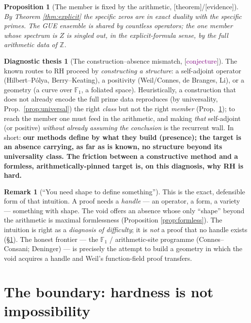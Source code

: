 \documentclass[11pt,a4paper]{article}
\newtheorem{proposition}[theorem]{Proposition}
\theoremstyle{definition}
\newtheorem{remark}[theorem]{Remark}
\newtheorem{principle}[theorem]{Diagnostic thesis}
\newcommand{\Z}{\mathbb{Z}}
\newcommand{\F}{\mathbb{F}}
\newcommand{\TAGthm}{{\small\textsf{[\textcolor{green!45!black}{theorem}]}}}
\newcommand{\TAGev}{{\small\textsf{[\textcolor{orange!80!black}{evidence}]}}}
\newcommand{\TAGconj}{{\small\textsf{[\textcolor{purple}{conjecture}]}}}
\begin{document}
\begin{proposition}[The member is fixed by the arithmetic, \TAGthm/\TAGev]
\label{prop:member}
By Theorem \ref{thm:explicit} the specific zeros are in exact duality with the
specific primes. The GUE \emph{ensemble} is shared by countless operators; the
\emph{one} member whose spectrum is $Z$ is singled out, in the
explicit-formula sense, by the full arithmetic data of $\Z$.
\end{proposition}

\begin{principle}[The construction--absence mismatch, \TAGconj]\label{prin:mismatch}
The known routes to RH proceed by \emph{constructing a structure}: a
self-adjoint operator (Hilbert--Pólya, Berry--Keating), a positivity
(Weil/Connes, de Branges, Li), or a geometry (a curve over $\F_1$, a
foliated space). Heuristically, a construction that does not already encode the
full prime data reproduces (by universality, Prop.\ \ref{prop:universal}) the
right \emph{class} but not the right \emph{member} (Prop.\ \ref{prop:member});
to reach the member one must feed in the arithmetic, and
making \emph{that} self-adjoint (or positive) \emph{without already assuming
the conclusion} is the recurrent wall. In short: \textbf{our methods define by
what they build (presence); the target is an absence carrying, as far as is
known, no structure beyond its universality class. The friction between a
constructive method and a formless, arithmetically-pinned target is, on this
diagnosis, why RH is hard.}
\end{principle}

\begin{remark}[``You need shape to define something'']
This is the exact, defensible form of that intuition. A proof needs a
\emph{handle} --- an operator, a form, a variety --- something with shape. The
void offers an absence whose only ``shape'' beyond the arithmetic is maximal
formlessness (Proposition \ref{prop:formless}). The intuition is right as a
\emph{diagnosis of difficulty}; it is \emph{not} a proof that no handle exists
(\S\ref{sec:boundary}). The honest frontier --- the $\F_1$ / arithmetic-site
programme (Connes--Consani; Deninger) --- is precisely the attempt to build a
geometry in which the void acquires a handle and Weil's function-field proof
transfers.
\end{remark}

\section{The boundary: hardness is not impossibility}\label{sec:boundary}
\end{document}
